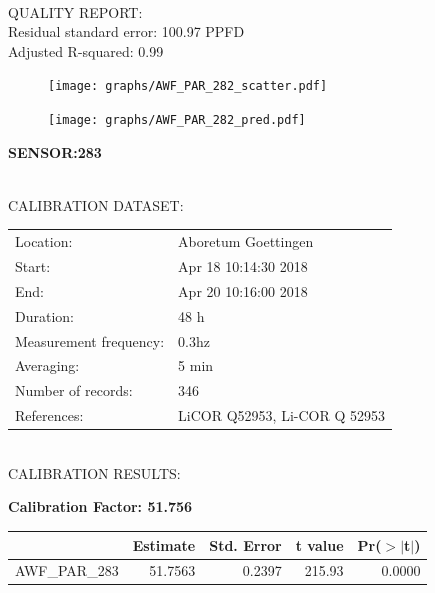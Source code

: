 \documentclass[oneside]{report}
\begin{document}
\hrulefill\\
QUALITY REPORT:\\
Residual standard error: 100.97 PPFD\\
Adjusted R-squared: 0.99



\begin{figure}[H]
  \centering
  \texttt{[image: graphs/AWF\_PAR\_282\_scatter.pdf]}
\end{figure}




\begin{figure}[H]
  \centering
  \texttt{[image: graphs/AWF\_PAR\_282\_pred.pdf]}
\end{figure}

\pagebreak


\begin{center}
\large{\textbf{SENSOR:283}}\\
\end{center}

\hrulefill\\
CALIBRATION DATASET:\\
\begin{table}[h!]
  \centering
  \label{tab:table1}
  \begin{tabular}{ll}
    Location: & Aboretum Goettingen\\ 
    
    
    Start:  & Apr 18 10:14:30 2018 \\
    End:   & Apr 20 10:16:00 2018\\ 
    Duration: & 48 h\\
    Measurement frequency: & 0.3hz\\
    Averaging:  &5 min\\
    Number of records: & 346 \\
    References: & LiCOR Q52953, Li-COR Q 52953 \\
  \end{tabular}
\end{table}

\hrulefill\\
CALIBRATION RESULTS:\\


\begin{center}
\textbf{\large{Calibration Factor: 51.756}}\\
\end{center}
\begin{table}[ht]
\centering
\begin{tabular}{rrrrr}
  \hline
 & Estimate & Std. Error & t value & Pr($>$$|$t$|$) \\ 
  \hline
AWF\_PAR\_283 & 51.7563 & 0.2397 & 215.93 & 0.0000 \\ 
   \hline
\end{tabular}
\end{table}
\end{document}
